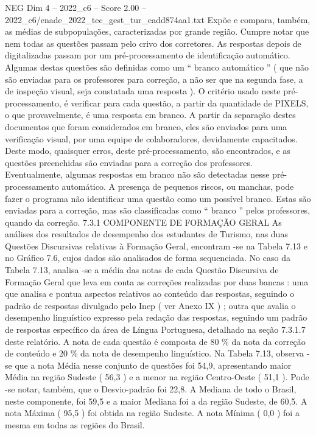 \begin{textsample}{NEG Dim 4 – 2022\_c6 – Score 2.00 – 2022\_c6/enade\_2022\_tec\_gest\_tur\_eadd874aa1.txt}
Expõe e compara, também, as médias de subpopulações, caracterizadas por grande região.
Cumpre notar que nem todas as questões passam pelo crivo dos corretores.
As respostas depois de digitalizadas passam por um pré-processamento de identificação automático.
Algumas destas questões são definidas como um “ branco automático ” ( que não são enviadas para os professores para correção, a não ser que na segunda fase, a de inspeção visual, seja constatada uma resposta ).
O critério usado neste pré-processamento, é verificar para cada questão, a partir da quantidade de PIXELS, o que provavelmente, é uma resposta em branco.
A partir da separação destes documentos que foram considerados em branco, eles são enviados para uma verificação visual, por uma equipe de colaboradores, devidamente capacitados.
Deste modo, quaisquer erros, deste pré-processamento, são encontrados, e as questões preenchidas são enviadas para a correção dos professores.
Eventualmente, algumas respostas em branco não são detectadas nesse pré-processamento automático.
A presença de pequenos riscos, ou manchas, pode fazer o programa não identificar uma questão como um possível branco.
Estas são enviadas para a correção, mas são classificadas como “ branco ” pelos professores, quando da correção. 7.3.1 COMPONENTE DE FORMAÇÃO GERAL As análises dos resultados de desempenho dos estudantes de Turismo, nas duas Questões Discursivas relativas à Formação Geral, encontram -se na Tabela 7.13 e no Gráfico 7.6, cujos dados são analisados de forma sequenciada.
No caso da Tabela 7.13, analisa -se a média das notas de cada Questão Discursiva de Formação Geral que leva em conta as correções realizadas por duas bancas : uma que analisa e pontua aspectos relativos ao conteúdo das respostas, seguindo o padrão de respostas divulgado pelo Inep ( ver Anexo IX ) ; outra que avalia o desempenho linguístico expresso pela redação das respostas, seguindo um padrão de respostas específico da área de Língua Portuguesa, detalhado na seção 7.3.1.7 deste relatório.
A nota de cada questão é composta de 80 \% da nota da correção de conteúdo e 20 \% da nota de desempenho linguístico.
Na Tabela 7.13, observa -se que a nota Média nesse conjunto de questões foi 54,9, apresentando maior Média na região Sudeste ( 56,3 ) e a menor na região Centro-Oeste ( 51,1 ).
Pode -se notar, também, que o Desvio-padrão foi 22,8.
A Mediana de todo o Brasil, neste componente, foi 59,5 e a maior Mediana foi a da região Sudeste, de 60,5.
A nota Máxima ( 95,5 ) foi obtida na região Sudeste.
A nota Mínima ( 0,0 ) foi a mesma em todas as regiões do Brasil.

\end{textsample}
